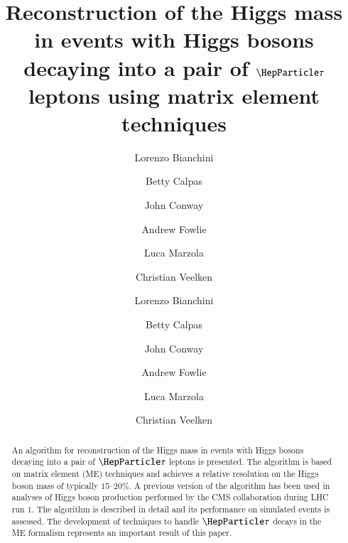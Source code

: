\documentclass[a4paper,english,11pt]{article}
\begin{document}
\ifx\ver\verPAPER
\begin{frontmatter}
\fi

\title{Reconstruction of the Higgs mass in events with Higgs bosons
  decaying into a pair of $\Pgt$ leptons using matrix element techniques}


\ifx\ver\verPreprint
\author[1]{Lorenzo Bianchini}
\author[2]{Betty Calpas}
\author[3]{John Conway}
\author[2]{Andrew Fowlie}
\author[4]{Luca Marzola}
\author[2]{Christian Veelken}
\fi
\ifx\ver\verPAPER
\author[eth]{Lorenzo Bianchini}
\author[tallinn]{Betty Calpas}
\author[ucd]{John Conway}
\author[tallinn]{Andrew Fowlie}
\author[tartu]{Luca Marzola}
\author[tallinn]{Christian Veelken}
\address[eth]{Institute for Particle Physics, ETH Zurich, 8093 Zurich, Switzerland}
\address[ucd]{Department of Physics, University of California, Davis, CA 95616}
\address[tallinn]{National Institute for Chemical Physics and Biophysics, 10143 Tallinn, Estonia}
\address[tartu]{Institute of Physics, University of Tartu, 51014 Tartu, Estonia}
\fi

\ifx\ver\verPreprint
\maketitle
\fi

\begin{abstract}
An algorithm for reconstruction of the Higgs mass in events with Higgs
bosons decaying into a pair of $\Pgt$ leptons is presented.
The algorithm is based on matrix element (ME) techniques and achieves
a relative resolution on the Higgs boson mass of typically $15$--$20\%$.
A previous version of the algorithm has been used in analyses of Higgs
boson production performed by the CMS collaboration during LHC run
$1$.
The algorithm is described in detail and its performance on simulated
events is assessed.
The development of techniques to handle $\Pgt$ decays in the ME
formalism represents an important result of this paper.
\end{abstract}

\ifx\ver\verPAPER
\end{frontmatter}
\fi
\end{document}
